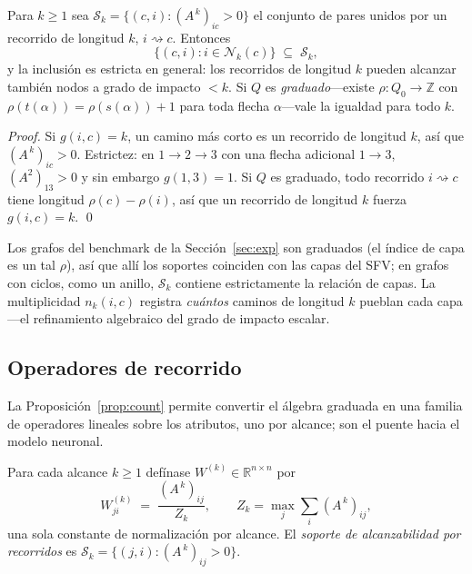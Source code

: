 \documentclass[runningheads]{llncs}
\newcommand{\RR}{\mathbb{R}}
\newcommand{\Adj}{A}
\newcommand{\walk}{\rightsquigarrow}
\begin{document}
\begin{proposition}\label{prop:fns}
Para $k\ge1$ sea $\mathcal{S}_k=\{(c,i):(\Adj^{\,k})_{ic}>0\}$ el conjunto de
pares unidos por un recorrido de longitud $k$, $i\walk c$. Entonces
\[
  \{(c,i): i\in \mathcal{N}_k(c)\} \;\subseteq\; \mathcal{S}_k ,
\]
y la inclusión es estricta en general: los recorridos de longitud $k$ pueden
alcanzar también nodos a grado de impacto $<k$. Si $Q$ es
\emph{graduado}---existe $\rho\colon Q_0\to\mathbb{Z}$ con
$\rho(t(\alpha))=\rho(s(\alpha))+1$ para toda flecha $\alpha$---vale la
igualdad para todo $k$.
\end{proposition}

\begin{proof}
Si $g(i,c)=k$, un camino más corto es un recorrido de longitud $k$, así que
$(\Adj^{\,k})_{ic}>0$. Estrictez: en $1\to2\to3$ con una flecha adicional
$1\to3$, $(\Adj^2)_{13}>0$ y sin embargo $g(1,3)=1$. Si $Q$ es graduado, todo
recorrido $i\walk c$ tiene longitud $\rho(c)-\rho(i)$, así que un recorrido de
longitud $k$ fuerza $g(i,c)=k$. \qed
\end{proof}

Los grafos del benchmark de la Sección~\ref{sec:exp} son graduados (el índice
de capa es un tal $\rho$), así que allí los soportes coinciden con las capas
del SFV; en grafos con ciclos, como un anillo, $\mathcal{S}_k$ contiene
estrictamente la relación de capas. La multiplicidad $n_k(i,c)$ registra
\emph{cuántos} caminos de longitud $k$ pueblan cada capa---el refinamiento
algebraico del grado de impacto escalar.

\subsection{Operadores de recorrido}

La Proposición~\ref{prop:count} permite convertir el álgebra graduada en una
familia de operadores lineales sobre los atributos, uno por alcance; son el
puente hacia el modelo neuronal.

\begin{definition}\label{def:walkop}
Para cada alcance $k\ge1$ defínase $W^{(k)}\in\RR^{n\times n}$ por
\[
  W^{(k)}_{j i}\;=\;\frac{(\Adj^{\,k})_{ij}}{\,Z_k\,},
  \qquad Z_k=\max_{j}\sum_i (\Adj^{\,k})_{ij},
\]
una sola constante de normalización por alcance. El \emph{soporte de
alcanzabilidad por recorridos} es
$\mathcal{S}_k=\{(j,i):(\Adj^{\,k})_{ij}>0\}$.
\end{definition}
\end{document}
